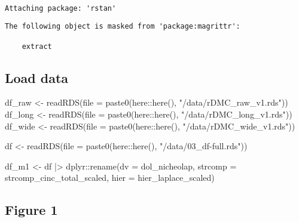 \documentclass[
  12,
  letterpaper,
  DIV=11,
  numbers=noendperiod]{scrartcl}
\newenvironment{Shaded}{\begin{snugshade}}{\end{snugshade}}
\newcommand{\AttributeTok}[1]{\textcolor[rgb]{0.40,0.45,0.13}{#1}}
\newcommand{\FunctionTok}[1]{\textcolor[rgb]{0.28,0.35,0.67}{#1}}
\newcommand{\NormalTok}[1]{\textcolor[rgb]{0.00,0.23,0.31}{#1}}
\newcommand{\OtherTok}[1]{\textcolor[rgb]{0.00,0.23,0.31}{#1}}
\newcommand{\SpecialCharTok}[1]{\textcolor[rgb]{0.37,0.37,0.37}{#1}}
\newcommand{\StringTok}[1]{\textcolor[rgb]{0.13,0.47,0.30}{#1}}
\begin{document}
\begin{verbatim}

Attaching package: 'rstan'
\end{verbatim}

\begin{verbatim}
The following object is masked from 'package:magrittr':

    extract
\end{verbatim}

\subsection{Load data}\label{load-data}

\begin{Shaded}
\begin{Highlighting}[numbers=left,,]
\NormalTok{df\_raw }\OtherTok{\textless{}{-}} \FunctionTok{readRDS}\NormalTok{(}\AttributeTok{file =} \FunctionTok{paste0}\NormalTok{(here}\SpecialCharTok{::}\FunctionTok{here}\NormalTok{(), }\StringTok{"/data/rDMC\_raw\_v1.rds"}\NormalTok{))}
\NormalTok{df\_long }\OtherTok{\textless{}{-}} \FunctionTok{readRDS}\NormalTok{(}\AttributeTok{file =} \FunctionTok{paste0}\NormalTok{(here}\SpecialCharTok{::}\FunctionTok{here}\NormalTok{(), }\StringTok{"/data/rDMC\_long\_v1.rds"}\NormalTok{))}
\NormalTok{df\_wide }\OtherTok{\textless{}{-}} \FunctionTok{readRDS}\NormalTok{(}\AttributeTok{file =} \FunctionTok{paste0}\NormalTok{(here}\SpecialCharTok{::}\FunctionTok{here}\NormalTok{(), }\StringTok{"/data/rDMC\_wide\_v1.rds"}\NormalTok{))}

\NormalTok{df }\OtherTok{\textless{}{-}} \FunctionTok{readRDS}\NormalTok{(}\AttributeTok{file =} \FunctionTok{paste0}\NormalTok{(here}\SpecialCharTok{::}\FunctionTok{here}\NormalTok{(), }\StringTok{"/data/03\_df{-}full.rds"}\NormalTok{))}

\NormalTok{df\_m1 }\OtherTok{\textless{}{-}}\NormalTok{ df }\SpecialCharTok{|\textgreater{}}
\NormalTok{  dplyr}\SpecialCharTok{::}\FunctionTok{rename}\NormalTok{(}\AttributeTok{dv =}\NormalTok{ dol\_nicheolap,}
                \AttributeTok{strcomp =}\NormalTok{ strcomp\_cinc\_total\_scaled,}
                \AttributeTok{hier =}\NormalTok{ hier\_laplace\_scaled)}
\end{Highlighting}
\end{Shaded}

\newpage

\subsection{Figure 1}\label{figure-1}
\end{document}
